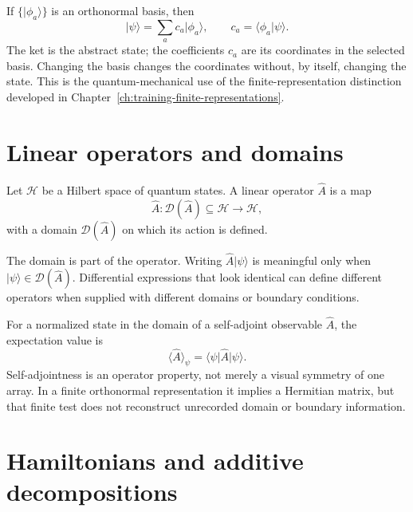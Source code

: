 If \(\{\lvert\phi_a\rangle\}\) is an orthonormal basis, then
\begin{equation}
  \lvert\psi\rangle
  =\sum_a c_a\lvert\phi_a\rangle,
  \qquad
  c_a=\langle\phi_a\vert\psi\rangle.
\end{equation}
The ket is the abstract state; the coefficients \(c_a\) are its coordinates in
the selected basis. Changing the basis changes the coordinates without, by
itself, changing the state. This is the quantum-mechanical use of the
finite-representation distinction developed in
Chapter~\ref{ch:training-finite-representations}.

\section{Linear operators and domains}

\begin{definition}
Let \(\mathcal H\) be a Hilbert space of quantum states. A linear operator
\(\hat A\) is a map
\begin{equation}
  \hat A:\mathcal D(\hat A)\subseteq\mathcal H\longrightarrow\mathcal H,
\end{equation}
with a domain \(\mathcal D(\hat A)\) on which its action is defined.
\end{definition}

The domain is part of the operator. Writing
\(\hat A\lvert\psi\rangle\) is meaningful only when
\(\lvert\psi\rangle\in\mathcal D(\hat A)\). Differential expressions that look
identical can define different operators when supplied with different domains
or boundary conditions.

For a normalized state in the domain of a self-adjoint observable \(\hat A\),
the expectation value is
\begin{equation}
  \langle\hat A\rangle_{\psi}
  =\langle\psi\rvert\hat A\lvert\psi\rangle.
\end{equation}
Self-adjointness is an operator property, not merely a visual symmetry of one
array. In a finite orthonormal representation it implies a Hermitian matrix, but
that finite test does not reconstruct unrecorded domain or boundary
information.

\section{Hamiltonians and additive decompositions}

